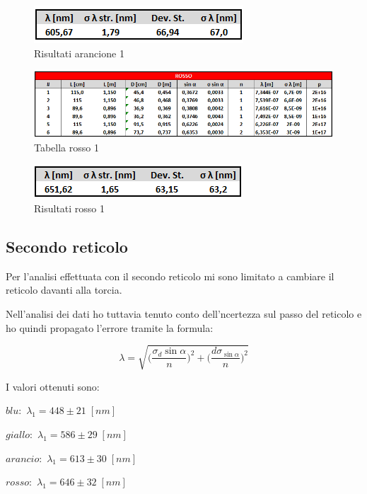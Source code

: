 \documentclass{article}
\begin{document}
\begin{figure}[h!]
  \centering
  \includegraphics[width=0.4\linewidth]{IM risultati arancio 1}
  \caption{Risultati arancione 1}
\end{figure}

\begin{figure}[h!]
  \centering
  \includegraphics[width=1\linewidth]{IM tabella rosso 1}
  \caption{Tabella rosso 1}
\end{figure}

\begin{figure}[h!]
  \centering
  \includegraphics[width=0.4\linewidth]{IM risultati rosso 1}
  \caption{Risultati rosso 1}
\end{figure}


\pagebreak%
\subsection{Secondo reticolo}
Per l'analisi effettuata con il secondo reticolo mi sono limitato a cambiare il reticolo davanti alla torcia. 

Nell'analisi dei dati ho tuttavia tenuto conto dell'ncertezza sul passo del reticolo e ho quindi propagato l'errore tramite la formula:

\begin{equation}
 \lambda = \sqrt{ \bigg( \frac{\sigma_d \sin \alpha}{n} \bigg)^2 + \bigg( \frac{d \sigma_{\sin \alpha}}{n} \bigg)^2 }
\end{equation}

I valori ottenuti sono:

\vspace{3mm}

\begin{centering}
$blu:$ \;\;\;\;\;\; $\lambda_1 = 448 \pm 21\; [nm]$

$giallo:$ \;\; $\lambda_1 = 586 \pm 29\; [nm]$ 

$arancio:$ $\lambda_1 = 613 \pm 30\; [nm]$ 

 $rosso:$ \;\;\; $\lambda_1 = 646 \pm 32\; [nm]$ 

\end{centering}
\end{document}
